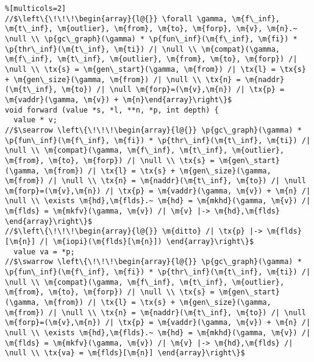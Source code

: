  
\begin{figure*}[!ht]
\vspace{-1ex}
  \begin{lstlisting}%[multicols=2]
//$\left\{\!\!\!\begin{array}{l@{}} \forall \gamma, \m{f\_inf}, \m{t\_inf}, \m{outlier}, \m{from}, \m{to}, \m{forp}, \m{v}, \m{n}.~ \null \\ \p{gc\_graph}(\gamma) * \p{fun\_inf}(\m{f\_inf}, \m{fi}) * \p{thr\_inf}(\m{t\_inf}, \m{ti}) /| \null \\ \m{compat}(\gamma, \m{f\_inf}, \m{t\_inf}, \m{outlier}, \m{from}, \m{to}, \m{forp}) /| \null \\ \tx{s} = \m{gen\_start}(\gamma, \m{from}) /| \tx{l} = \tx{s} + \m{gen\_size}(\gamma, \m{from}) /| \null \\ \tx{n} = \m{naddr}(\m{t\_inf}, \m{to}) /| \null \m{forp}=(\m{v},\m{n}) /| \tx{p} = \m{vaddr}(\gamma, \m{v}) + \m{n}\end{array}\right\}$
void forward (value *s, *l, **n, *p, int depth) {
  value * v;
//$\searrow \left\{\!\!\!\begin{array}{l@{}} \p{gc\_graph}(\gamma) * \p{fun\_inf}(\m{f\_inf}, \m{fi}) * \p{thr\_inf}(\m{t\_inf}, \m{ti}) /| \null \\ \m{compat}(\gamma, \m{f\_inf}, \m{t\_inf}, \m{outlier}, \m{from}, \m{to}, \m{forp}) /| \null \\ \tx{s} = \m{gen\_start}(\gamma, \m{from}) /| \tx{l} = \tx{s} + \m{gen\_size}(\gamma, \m{from}) /| \null \\ \tx{n} = \m{naddr}(\m{t\_inf}, \m{to}) /| \null \m{forp}=(\m{v},\m{n}) /| \tx{p} = \m{vaddr}(\gamma, \m{v}) + \m{n} /| \null \\ \exists \m{hd},\m{flds}.~ \m{hd} = \m{mkhd}(\gamma, \m{v}) /| \m{flds} = \m{mkfv}(\gamma, \m{v}) /| \m{v} |-> \m{hd},\m{flds} \end{array}\right\}$
//$\left\{\!\!\!\begin{array}{l@{}} \m{ditto} /| \tx{p} |-> \m{flds}[\m{n}] /| \m{iopi}(\m{flds}[\m{n}]) \end{array}\right\}$
  value va = *p; 
//$\swarrow \left\{\!\!\!\begin{array}{l@{}} \p{gc\_graph}(\gamma) * \p{fun\_inf}(\m{f\_inf}, \m{fi}) * \p{thr\_inf}(\m{t\_inf}, \m{ti}) /| \null \\ \m{compat}(\gamma, \m{f\_inf}, \m{t\_inf}, \m{outlier}, \m{from}, \m{to}, \m{forp}) /| \null \\ \tx{s} = \m{gen\_start}(\gamma, \m{from}) /| \tx{l} = \tx{s} + \m{gen\_size}(\gamma, \m{from}) /| \null \\ \tx{n} = \m{naddr}(\m{t\_inf}, \m{to}) /| \null \m{forp}=(\m{v},\m{n}) /| \tx{p} = \m{vaddr}(\gamma, \m{v}) + \m{n} /| \null \\ \exists \m{hd},\m{flds}.~ \m{hd} = \m{mkhd}(\gamma, \m{v}) /| \m{flds} = \m{mkfv}(\gamma, \m{v}) /| \m{v} |-> \m{hd},\m{flds} /| \null \\ \tx{va} = \m{flds}[\m{n}] \end{array}\right\}$

\end{lstlisting}
\end{figure*}
